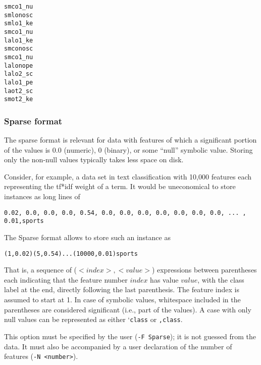 \documentclass{book}
\begin{document}
\begin{footnotesize}
\begin{verbatim}
smco1_nu
smlonosc
smlo1_ke
smco1_nu
lalo1_ke
smconosc
smco1_nu
lalonope
lalo2_sc
lalo1_pe
laot2_sc
smot2_ke
\end{verbatim}
\end{footnotesize}

\subsubsection{Sparse format}

The sparse format is relevant for data with features of which a
significant portion of the values is $0.0$ (numeric), $0$ (binary), or
some ``null'' symbolic value. Storing only the non-null values
typically takes less space on disk.

Consider, for example, a data set in text classification with 10,000
features each representing the tf*idf weight of a term. It would be
uneconomical to store instances as long lines of

\begin{footnotesize}
\begin{verbatim}
0.02, 0.0, 0.0, 0.0, 0.54, 0.0, 0.0, 0.0, 0.0, 0.0, 0.0, 0.0, ... , 0.01,sports
\end{verbatim}
\end{footnotesize}

The Sparse format allows to store such an instance as

\begin{footnotesize}
\begin{verbatim}
(1,0.02)(5,0.54)...(10000,0.01)sports
\end{verbatim}
\end{footnotesize}

That is, a sequence of ($<index>,<value>$) expressions between
parentheses each indicating that the feature number $index$ has value
$value$, with the class label at the end, directly following the last
parenthesis. The feature index is assumed to start at 1. In case of
symbolic values, whitespace included in the parentheses are considered
significant (i.e., part of the values). A case with only null values
can be represented as either `{\tt class} or {\tt ,class}.

This option must be specified by the user ({\tt -F Sparse}); it is not
guessed from the data. It must also be accompanied by a user
declaration of the number of features ({\tt -N <number>}).
\end{document}
